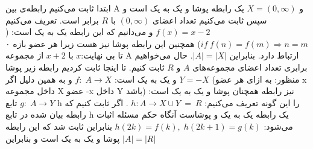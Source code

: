 \p
ابتدا ثابت می‌کنیم رابطه‌ی بین A و 
$X = (0, \infty)$ یک رابطه پوشا و یک به یک است و سپس ثابت می‌کنیم تعداد اعضای
 $(0, \infty)$
 با $R$ برابر است.
 		\newline
 		تعریف می‌کنیم $f(x) = x - 2$ و می‌دانیم که این رابطه یک به یک است: ($if \: f(n) = f(m) \Rightarrow n = m$)
 		\newline
 		همچنین این رابطه پوشا نیز هست زیرا هر عضو بازه ۰ تا بی نهایت:$x$ با $x + 2$ از مجموعه A ارتباط دارد.
 		بنابراین $|A| = |X|$.
 		\bigbreak
 		حال می‌خواهیم برابری تعداد اعضای مجموعه‌های $A$ و $R$ ثابت کنیم.
 		\newline
 		تا اینجا ثابت کردیم رابطه زیر پوشا و یک به یک است:
 		\bigbreak
 		$f:\; A \rightarrow X$
 		\bigbreak
 		و به همین دلیل اگر $Y = -X$ (منظور: به ازای هر عضو x داخل مجموعه X عضو -x داخل Y باشد) نیز رابطه همچنان پوشا و یک به یک است:
 		\bigbreak
 		$g:\; A \rightarrow Y$
 		\bigbreak
 		تابع h را این گونه تعریف می‌کنیم: $h: A \rightarrow X \cup Y \:= \: R$ . اگر ثابت کنیم که رابطه بیان شده در تابع h یک رابطه یک به یک و پوشاست آنگاه حکم مسئله اثبات می‌شود:
 		\bigbreak
 		$h(2k) = f(k),\; h(2k+1) = g(k)$
 		\bigbreak
 		بنابراین ثابت شد که این رابطه پوشا و یک به یک است و بنابراین $|A| = |R|$
 		\bigbreak	
